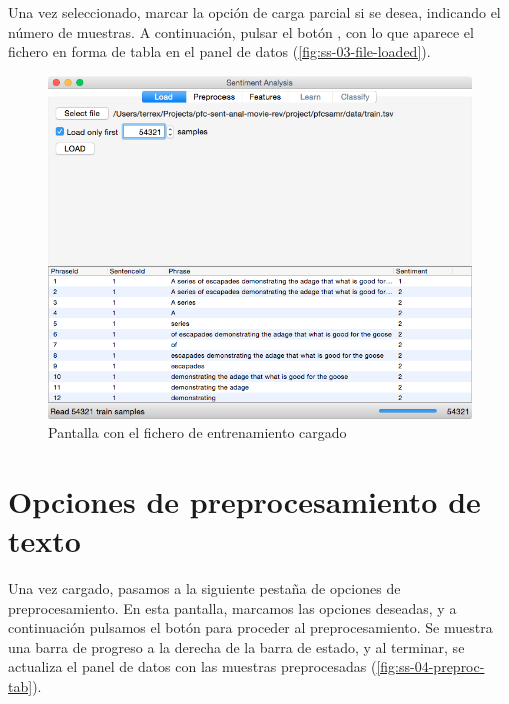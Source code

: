 \newpage
Una vez seleccionado, marcar la opción de carga parcial si se desea, indicando el número de muestras. A continuación, pulsar el botón , con lo que aparece el fichero en forma de tabla en el panel de datos (\autoref{fig:ss-03-file-loaded}).

\begin{figure}[H]
\centering
\includegraphics[width=14cm]{ss-03-file-loaded}
\caption{Pantalla con el fichero de entrenamiento cargado}
\label{fig:ss-03-file-loaded}
\end{figure}

\newpage
\section{Opciones de preprocesamiento de texto}
\label{sec:manual-preproc}

Una vez cargado, pasamos a la siguiente pestaña de opciones de preprocesamiento. En esta pantalla, marcamos las opciones deseadas, y a continuación pulsamos el botón  para proceder al preprocesamiento. Se muestra una barra de progreso a la derecha de la barra de estado, y al terminar, se actualiza el panel de datos con las muestras preprocesadas (\autoref{fig:ss-04-preproc-tab}).

